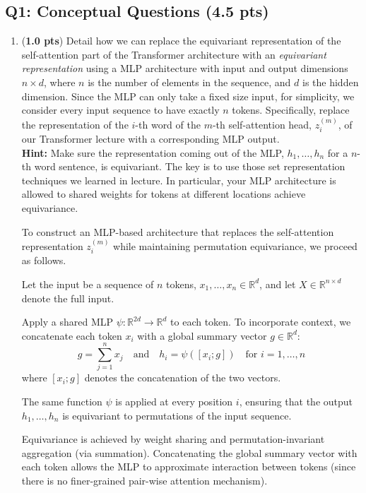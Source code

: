 \subsection*{Q1: Conceptual Questions (4.5 pts)}

\begin{enumerate}



\item ({\bf 1.0 pts}) Detail how we can replace the equivariant representation of the self-attention part of the Transformer architecture with an {\em equivariant representation} using a MLP architecture with input and output dimensions $n\times d$, where $n$ is the number of elements in the sequence, and $d$ is the hidden dimension. Since the MLP can only take a fixed size input, for simplicity, we consider every input sequence to have exactly $n$ tokens.
Specifically, replace the representation of the $i$-th word of the $m$-th self-attention head,  $z^{(m)}_i$, of our Transformer lecture with a corresponding MLP output.\\
{\bf Hint:}  Make sure the representation coming out of the MLP, $h_1,\ldots,h_n$ for a $n$-th word sentence, is equivariant. The key is to use those set representation techniques we learned in lecture. In particular, your MLP architecture is allowed to shared weights for tokens at different locations achieve equivariance.

\begin{answerbox}[3.5in]
To construct an MLP-based architecture that replaces the self-attention
representation $z^{(m)}_i$ while maintaining permutation equivariance, we
proceed as follows.

Let the input be a sequence of $n$ tokens, $x_1, \ldots, x_n \in \mathbb{R}^d$,
and let $X \in \mathbb{R}^{n \times d}$ denote the full input.

Apply a shared MLP $\psi: \mathbb{R}^{2d} \to \mathbb{R}^d$ to each token. To incorporate context, we concatenate each token $x_i$ with a global summary vector $g \in \mathbb{R}^d$:
\[
g = \sum_{j=1}^n x_j
\quad \text{and} \quad
h_i = \psi([x_i; g]) \quad \text{for } i = 1, \ldots, n
\]
where $[x_i; g]$ denotes the concatenation of the two vectors.

The same function $\psi$ is applied at every position $i$, ensuring that the
output $h_1, \ldots, h_n$ is equivariant to permutations of the input sequence.

Equivariance is achieved by weight sharing and permutation-invariant aggregation
(via summation). Concatenating the global summary vector with each token allows
the MLP to approximate interaction between tokens (since there is no
finer-grained pair-wise attention mechanism).
\end{answerbox}


\end{enumerate}
